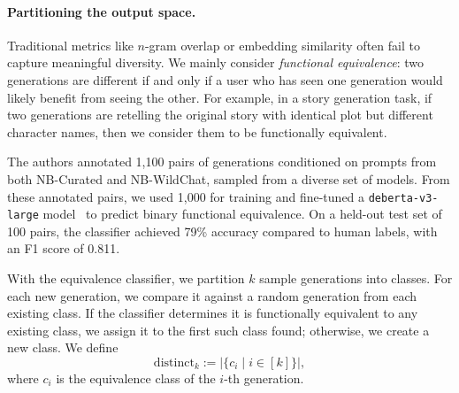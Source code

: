 \paragraph{Partitioning the output space.}
Traditional metrics like $n$-gram overlap or embedding similarity often fail to capture meaningful diversity.
We mainly consider \emph{functional equivalence}: two generations are different if and only if a user who has seen one generation would likely benefit from seeing the other.
For example, in a story generation task, if two generations are retelling the original story with identical plot but different character names, then we consider them to be functionally equivalent.

The authors annotated 1,100 pairs of generations conditioned on prompts from both NB-Curated and NB-WildChat, sampled from a diverse set of models.
From these annotated pairs, we used 1,000 for training and fine-tuned a \texttt{deberta-v3-large} model~\cite{he2021deberta} to predict binary functional equivalence.
On a held-out test set of 100 pairs, the classifier achieved 79\% accuracy compared to human labels, with an F1 score of 0.811.


With the equivalence classifier, we partition $k$ sample generations into classes.
For each new generation, we compare it against a random generation from each existing class.
If the classifier determines it is functionally equivalent to any existing class, we assign it to the first such class found; otherwise, we create a new class.
We define
\begin{equation}
\mathrm{distinct}_k := \bigl|\bigl\{c_i \mid i \in [k]\bigr\}\bigr|,
\end{equation}
where $c_i$ is the equivalence class of the $i$-th generation.

